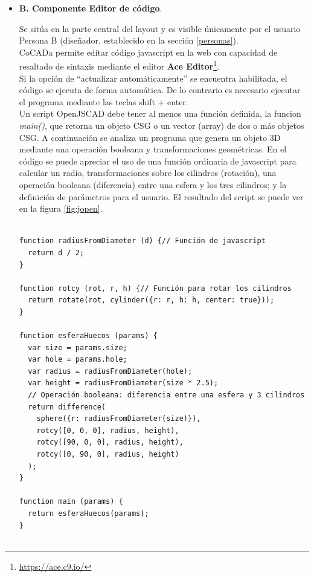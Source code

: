 \begin{itemize}
\item \textbf{B. Componente Editor de código}.

\begin{itemize}
Se sitúa en la parte central del layout y es visible únicamente por el usuario Persona B (diseñador, establecido en la sección \ref{personas}).\\
CoCADa permite editar código javascript en la web con capacidad de resaltado de sintaxis mediante el editor \textbf{Ace Editor}\footnote{\url{https://ace.c9.io/}}. \\Si la opción de ``actualizar automáticamente'' se encuentra habilitada, el código se ejecuta de forma automática. De lo contrario es necesario ejecutar el programa mediante las teclas shift + enter.\\ 
Un script OpenJSCAD debe tener al menos una función definida, la funcion \textit{main()}, que retorna un objeto CSG o un vector (array) de dos o más objetos CSG. 
A continuación se analiza un programa que genera un objeto 3D mediante una operación booleana y transformaciones geométricas. En el código se puede apreciar el uso de una función ordinaria de javascript para calcular un radio, transformaciones sobre los cilindros (rotación), una operación booleana (diferencia) entre una esfera y los tres cilindros; y la definición de parámetros para el usuario. El resultado del script se puede ver  en la figura \ref{fig:jopen}.\\

\end{itemize}

\begin{verbatim}

function radiusFromDiameter (d) {// Función de javascript
  return d / 2;
}

function rotcy (rot, r, h) {// Función para rotar los cilindros
  return rotate(rot, cylinder({r: r, h: h, center: true}));
}

function esferaHuecos (params) {
  var size = params.size;
  var hole = params.hole;
  var radius = radiusFromDiameter(hole);
  var height = radiusFromDiameter(size * 2.5);
  // Operación booleana: diferencia entre una esfera y 3 cilindros
  return difference(
    sphere({r: radiusFromDiameter(size)}),
    rotcy([0, 0, 0], radius, height),
    rotcy([90, 0, 0], radius, height),
    rotcy([0, 90, 0], radius, height)
  );
}

function main (params) {
  return esferaHuecos(params);
}


\end{verbatim}
\end{itemize}
